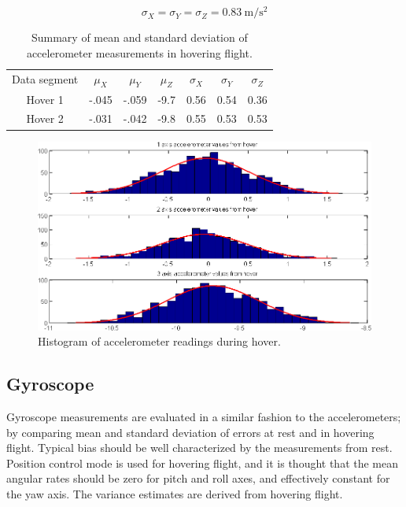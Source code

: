 \documentclass{article}
\begin{document}
\begin{equation}
\sigma_X=\sigma_Y=\sigma_Z=0.83 \ \mathrm{m/s^2}
\end{equation}

\begin{table}[tb!]
\centering
\begin{tabular}{c|c|c|c|c|c|c}
Data segment & $\mu_X$ & $\mu_Y$ & $\mu_Z$ & $\sigma_X$ & $\sigma_Y$ & $\sigma_Z$\\
Hover 1 & -.045 & -.059 & -9.7 & 0.56 & 0.54 & 0.36\\
Hover 2 & -.031 & -.042 & -9.8 & 0.55 & 0.53 & 0.53\\
\end{tabular}
\caption{Summary of mean and standard deviation of accelerometer measurements in hovering flight.}
\label{tab:acc_hover}
\end{table}

\begin{figure}[p!]
\centering
\includegraphics[width=\textwidth]{../rest_accel_hist.png}
\caption{Histogram of accelerometer readings during hover.}
\label{fig:accel_hist_hover}
\end{figure}

\subsection{Gyroscope}

Gyroscope measurements are evaluated in a similar fashion to the accelerometers; by comparing mean and standard deviation of errors at rest and in hovering flight. Typical bias should be well characterized by the measurements from rest. Position control mode is used for hovering flight, and it is thought that the mean angular rates should be zero for pitch and roll axes, and effectively constant for the yaw axis. The variance estimates are derived from hovering flight.
\end{document}
